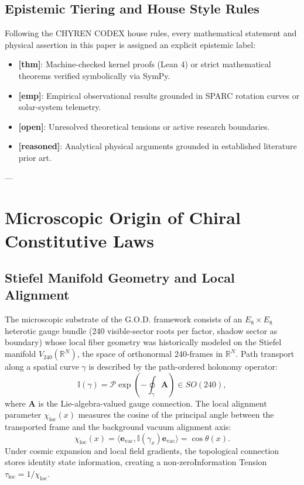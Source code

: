 \documentclass[11pt,a4paper]{article}
\theoremstyle{definition}
\begin{document}
\subsection{Epistemic Tiering and House Style Rules}
Following the CHYREN CODEX house rules, every mathematical statement and physical assertion in this paper is assigned an explicit epistemic label:
\begin{itemize}
\item \textbf{[thm]}: Machine-checked kernel proofs (Lean 4) or strict mathematical theorems verified symbolically via SymPy.
\item \textbf{[emp]}: Empirical observational results grounded in SPARC rotation curves or solar-system telemetry.
\item \textbf{[open]}: Unresolved theoretical tensions or active research boundaries.
\item \textbf{[reasoned]}: Analytical physical arguments grounded in established literature prior art.
\end{itemize}

---

\section{Microscopic Origin of Chiral Constitutive Laws}

\subsection{Stiefel Manifold Geometry and Local Alignment}
The microscopic substrate of the G.O.D. framework consists of an $E_8 \times E_8$ heterotic gauge bundle (240 visible-sector roots per factor, shadow sector as boundary) whose local fiber geometry was historically modeled on the Stiefel manifold $V_{240}(\mathbb{R}^N)$, the space of orthonormal 240-frames in $\mathbb{R}^N$. Path transport along a spatial curve $\gamma$ is described by the path-ordered holonomy operator:
\begin{equation}
\mathbb{I}(\gamma) = \mathcal{P} \exp \left( -\oint_\gamma \mathbf{A} \right) \in SO(240),
\end{equation}
where $\mathbf{A}$ is the Lie-algebra-valued gauge connection. The local alignment parameter $\chi_{\text{loc}}(x)$ measures the cosine of the principal angle between the transported frame and the background vacuum alignment axis:
\begin{equation}
\chi_{\text{loc}}(x) = \langle \mathbf{e}_{\text{vac}}, \mathbb{I}(\gamma_x) \mathbf{e}_{\text{vac}} \rangle = \cos\theta(x).
\end{equation}
Under cosmic expansion and local field gradients, the topological connection stores identity state information, creating a non-zeroInformation Tension $\tau_{\text{loc}} = 1/\chi_{\text{loc}}$.
\end{document}

